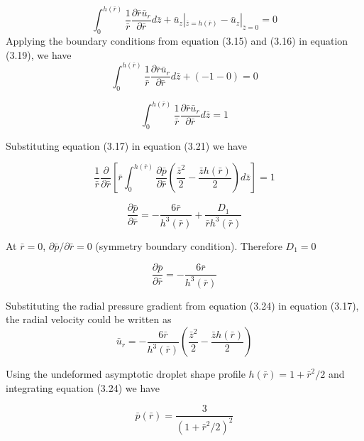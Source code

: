 \documentclass{jfm}
\begin{document}
\begin{equation}
    \int_0^{h(\bar{r})}\frac{1}{\bar{r}}\frac{{\partial}\bar{r}{\bar{u}}_r}{\partial{\bar{r}}}d\bar{z}+ {\bar{u}}_z|_{\bar{z}=h(\bar{r})}-{\bar{u}}_z|_{\bar{z}=0}= 0
\end{equation}
Applying the boundary conditions from equation (3.15) and (3.16) in equation (3.19), we have
\begin{equation}
    \int_0^{h(\bar{r})}\frac{1}{\bar{r}}\frac{{\partial}\bar{r}{\bar{u}}_r}{\partial{\bar{r}}}d\bar{z}+ (-1 - 0) = 0
\end{equation}

\begin{equation}
     \int_0^{h(\bar{r})}\frac{1}{\bar{r}}\frac{{\partial}\bar{r}{\bar{u}}_r}{\partial{\bar{r}}}d\bar{z} = 1
\end{equation}

Substituting equation (3.17) in equation (3.21) we have

\begin{equation}
    \frac{1}{\bar{r}}\frac{\partial}{\partial\bar{r}}\left[\bar{r}\int_0^{h(\bar{r})}\frac{{\partial}\bar{p}}{{\partial}\bar{r}}\left(\frac{{\bar{z}}^2}{2}-\frac{{\bar{z}h(\bar{r})}}{2}\right)d\bar{z}\right]=1
\end{equation}

\begin{equation}
    \frac{{\partial}\bar{p}}{{\partial}\bar{r}} = -\frac{6\bar{r}}{{h^3(\bar{r})}} + \frac{D_1}{\bar{r}{h^3(\bar{r})}}
\end{equation}

At $\bar{r}=0$, ${{\partial}\bar{p}}/{{\partial}\bar{r}}=0$ (symmetry boundary condition). Therefore $D_1=0$

\begin{equation}
    \frac{{\partial}\bar{p}}{{\partial}\bar{r}} = -\frac{6\bar{r}}{{h^3(\bar{r})}} 
\end{equation}

Substituting the radial pressure gradient from equation (3.24) in equation (3.17), the radial velocity could be written as
\begin{equation}
     {\bar{u}}_r = -\frac{6\bar{r}}{{h^3(\bar{r})}} \left(\frac{{\bar{z}}^2}{2} - \frac{\bar{z}h(\bar{r})}{2}\right)
\end{equation}


Using the undeformed asymptotic droplet shape profile $h(\bar{r})=1+{\bar{r}}^2/2$ and integrating equation (3.24) 
we have

\begin{equation}
    \bar{p}(\bar{r}) = \frac{3}{(1+{\bar{r}}^2/2)^2}
\end{equation}
\end{document}
